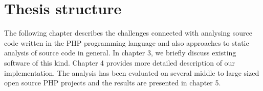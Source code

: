     \section{Thesis structure}
    
    The following chapter describes the challenges connected with analysing source code 
    written in the PHP programming language and also approaches to static analysis of 
    source code in general. In chapter 3, we briefly discuss existing software of 
    this kind. Chapter 4 provides more detailed description of our implementation. 
    The analysis has been evaluated on several middle to large sized open source 
    PHP projects and the results are presented in chapter 5.
    